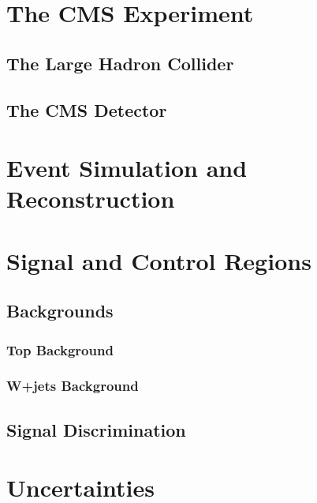 \documentclass[12pt]{niuthesis}
\begin{document}
    
    
    
\chapter{The CMS Experiment}
    \section{The Large Hadron Collider}

    \section{The CMS Detector}

\chapter{Event Simulation and Reconstruction}

\chapter{Signal and Control Regions}

    \section{Backgrounds}
        \subsection{Top Background}
    
        \subsection{W+jets Background}
    
    \section{Signal Discrimination}

\chapter{Uncertainties}
\end{document}

